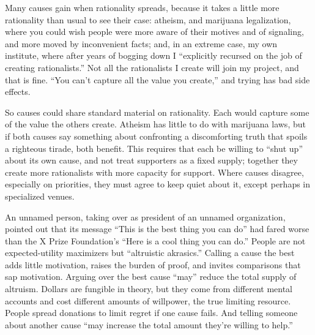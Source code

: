
Many causes gain when rationality spreads, because it takes a little more rationality than usual to see their case: atheism, and marijuana legalization, where you could wish people were more aware of their motives and of signaling, and more moved by inconvenient facts; and, in an extreme case, my own institute, where after years of bogging down I ``explicitly recursed on the job of creating rationalists.''  Not all the rationalists I create will join my project, and that is fine. ``You can't capture all the value you create,'' and trying has bad side effects.

So causes could share standard material on rationality. Each would capture some of the value the others create. Atheism has little to do with marijuana laws, but if both causes say something about confronting a discomforting truth that spoils a righteous tirade, both benefit. This requires that each be willing to ``shut up'' about its own cause, and not treat supporters as a fixed supply; together they create more rationalists with more capacity for support. Where causes disagree, especially on priorities, they must agree to keep quiet about it, except perhaps in specialized venues.

An unnamed person, taking over as president of an unnamed organization, pointed out that its message ``This is the best thing you can do'' had fared worse than the X Prize Foundation's ``Here is a cool thing you can do.''  People are not expected-utility maximizers but ``altruistic akrasics.'' Calling a cause the best adds little motivation, raises the burden of proof, and invites comparisons that sap motivation.  Arguing over the best cause ``may'' reduce the total supply of altruism. Dollars are fungible in theory, but they come from different mental accounts and cost different amounts of willpower, the true limiting resource. People spread donations to limit regret if one cause fails. And telling someone about another cause ``may increase the total amount they're willing to help.'' 

